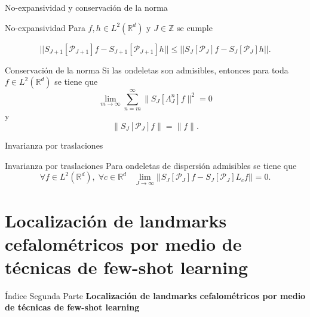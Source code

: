 \documentclass[aspectratio=43]{beamer}
\begin{document}
\begin{frame}{No-expansividad y conservación de la norma}

  \begin{alertblock}{No-expansividad}
    \noindent Para $f,h \in L^2(\mathbb{R}^d)$ y $J\in \mathbb{Z}$ se cumple

    \begin{equation*} \label{eq::1.10}
      || S_{J+1} [\mathcal{P}_{J+1}]f- S_{J+1}[\mathcal{P}_{J+1}]h || \leq ||S_J[\mathcal{P}_J]f - S_J[\mathcal{P}_J]h ||. 
    \end{equation*}
  \end{alertblock}

  \begin{alertblock}{Conservación de la norma}
    Si las ondeletas son admisibles, entonces para toda $f\in L^2(\mathbb{R}^d)$ se tiene que
    \begin{equation*}  
      \lim_{m\rightarrow\infty} \sum_{n=m}^{\infty} \|S_J[\Lambda_J^n]f\|^2=0
    \end{equation*}
    y
    \begin{equation*}
      \|S_J[\mathcal{P}_J]f\|=\|f\|.
    \end{equation*}
  \end{alertblock}
\end{frame}

\begin{frame}{Invarianza por traslaciones}
  \begin{alertblock}{Invarianza por traslaciones}
    Para ondeletas de dispersión admisibles se tiene que 
    $$\forall f \in L^2(\mathbb{R}^d), \; \forall c\in \mathbb{R}^d \;\;\; \lim_{J\rightarrow \infty}||S_J[\mathcal{P}_J] f-S_J[\mathcal{P}_J] L_cf||=0.$$
  \end{alertblock}
\end{frame}

\part{Localización de landmarks cefalométricos por medio de técnicas de few-shot learning}

\begin{frame}{Índice Segunda Parte}
  \textcolor{tudCyan}{\textbf{Localización de landmarks cefalométricos por medio de técnicas de few-shot learning}}
  \medskip
  \tableofcontents[part=2]
\end{frame}

\end{document}
